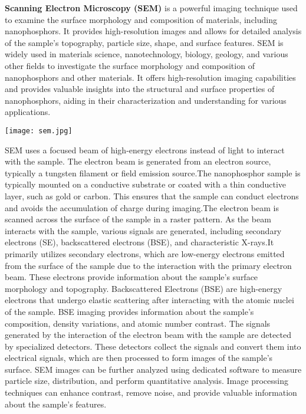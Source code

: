 \documentclass[../characterization.tex]{subfiles}
\begin{document}
    \textbf{Scanning Electron Microscopy (SEM)}\cite{b12} is a powerful imaging technique used to examine the surface 
    morphology and composition of materials, including nanophosphors. It provides high-resolution images and 
    allows for detailed analysis of the sample's topography, particle size, shape, and surface features. SEM is 
    widely used in materials science, nanotechnology, biology, geology, and various other fields to investigate 
    the surface morphology and composition of nanophosphors and other materials. It offers high-resolution 
    imaging capabilities and provides valuable insights into the structural and surface properties of 
    nanophosphors, aiding in their characterization and understanding for various applications.
    \begin{Figure}
        \centering
        \texttt{[image: sem.jpg]}
        \label{fig:sem}
    \end{Figure}
    SEM uses a focused beam of high-energy electrons instead of light to interact with the sample. 
    The electron beam is generated from an electron source, typically a tungsten filament or field emission 
    source.The nanophosphor sample is typically mounted on a conductive substrate or coated with a thin 
    conductive layer, such as gold or carbon. This ensures that the sample can conduct electrons and avoids the 
    accumulation of charge during imaging.The electron beam is scanned across the surface of the sample in a 
    raster pattern. As the beam interacts with the sample, various signals are generated, including secondary 
    electrons (SE), backscattered electrons (BSE), and characteristic X-rays.It primarily utilizes secondary 
    electrons, which are low-energy electrons emitted from the surface of the sample due to the interaction with 
    the primary electron beam. These electrons provide information about the sample's surface morphology and 
    topography. Backscattered Electrons (BSE) are high-energy electrons that undergo elastic scattering after 
    interacting with the atomic nuclei of the sample. BSE imaging provides information about the sample's 
    composition, density variations, and atomic number contrast. The signals generated by the interaction of the 
    electron beam with the sample are detected by specialized detectors. These detectors collect the signals 
    and convert them into electrical signals, which are then processed to form images of the sample's surface. SEM 
    images can be further analyzed using dedicated software to measure particle size, distribution, and perform 
    quantitative analysis. Image processing techniques can enhance contrast, remove noise, and provide valuable 
    information about the sample's features.
\end{document}
